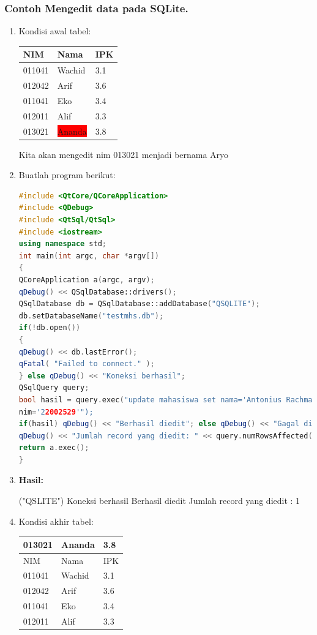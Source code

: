 \subsubsection*{Contoh Mengedit data pada SQLite.}

\begin{enumerate}
\item Kondisi awal tabel:

\begin{tabular}{|l|l|l|}
\hline
NIM & Nama & IPK \\ \hline
011041 & Wachid & 3.1 \\ \hline
012042 & Arif & 3.6 \\ \hline
011041 & Eko & 3.4 \\ \hline
012011 & Alif & 3.3 \\ \hline
013021 & \colorbox{red}{Ananda} & 3.8 \\ \hline
\end{tabular}

Kita akan mengedit nim 013021 menjadi bernama Aryo

\item Buatlah program berikut:

\begin{lstlisting}[language=c++, caption=Mengedit data pada SQLite]
#include <QtCore/QCoreApplication>
#include <QDebug>
#include <QtSql/QtSql>
#include <iostream>
using namespace std;
int main(int argc, char *argv[])
{
QCoreApplication a(argc, argv);
qDebug() << QSqlDatabase::drivers();
QSqlDatabase db = QSqlDatabase::addDatabase("QSQLITE");
db.setDatabaseName("testmhs.db");
if(!db.open())
{
qDebug() << db.lastError();
qFatal( "Failed to connect." );
} else qDebug() << "Koneksi berhasil";
QSqlQuery query;
bool hasil = query.exec("update mahasiswa set nama='Antonius Rachmat C' where
nim='22002529'");
if(hasil) qDebug() << "Berhasil diedit"; else qDebug() << "Gagal diedit";
qDebug() << "Jumlah record yang diedit: " << query.numRowsAffected();
return a.exec();
}
\end{lstlisting}

\item \textbf{Hasil:}
\begin{lcverbatim}
("QSLITE")
Koneksi berhasil
Berhasil diedit
Jumlah record yang diedit : 1
\end{lcverbatim}
\item Kondisi akhir tabel:

\begin{tabular}{|l|l|l|}
\hline
013021 & Ananda & 3.8 \\ \hline
NIM & Nama & IPK \\ \hline
011041 & Wachid & 3.1 \\ \hline
012042 & Arif & 3.6 \\ \hline
011041 & Eko & 3.4 \\ \hline
012011 & Alif & 3.3 \\ \hline

\end{tabular}
\end{enumerate}

